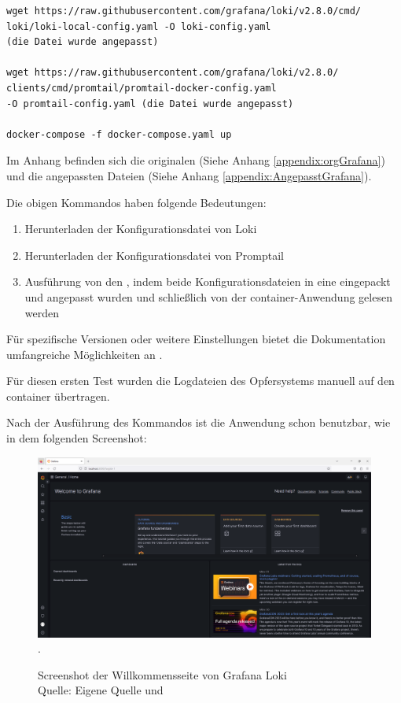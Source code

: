 {
\begin{lstlisting}[frame=single]
wget https://raw.githubusercontent.com/grafana/loki/v2.8.0/cmd/
loki/loki-local-config.yaml -O loki-config.yaml
(die Datei wurde angepasst)

wget https://raw.githubusercontent.com/grafana/loki/v2.8.0/
clients/cmd/promtail/promtail-docker-config.yaml
-O promtail-config.yaml (die Datei wurde angepasst)

docker-compose -f docker-compose.yaml up 
\end{lstlisting}
}

Im Anhang befinden sich die originalen (Siehe Anhang \ref{appendix:orgGrafana}) und die angepassten Dateien (Siehe Anhang \ref{appendix:AngepasstGrafana}).

Die obigen Kommandos haben folgende Bedeutungen:
\begin{enumerate}[noitemsep]
   \item Herunterladen der Konfigurationsdatei von Loki
   \item Herunterladen der Konfigurationsdatei von Promptail
   \item Ausführung von den , indem beide Konfigurationsdateien in eine eingepackt und angepasst wurden und schließlich von der \gls{container}-Anwendung gelesen werden
\end{enumerate}

Für spezifische Versionen oder weitere Einstellungen bietet die Dokumentation umfangreiche Möglichkeiten an \citep{GrafanaLoki_run}.

Für diesen ersten Test wurden die Logdateien des Opfersystems manuell auf den \gls{container} übertragen.

\newpage
\thispagestyle{lscape}
\begin{landscape}
   Nach der Ausführung des Kommandos ist die Anwendung schon benutzbar, wie in dem folgenden Screenshot:
   \begin{center}
      \begin{figure}[H]
         \centering
         \includegraphics[width=1.3\textwidth]{assets/Installation_Grafana.png}.
         \caption[Screenshot der Willkommensseite von Grafana Loki]
         {Screenshot der Willkommensseite von Grafana Loki\\Quelle: Eigene Quelle und \citep{Grafana_Logs}}
         \centering
      \end{figure}
   \end{center}
\end{landscape}

